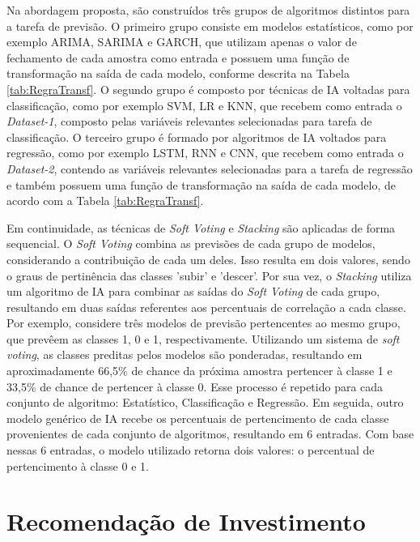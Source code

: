 Na abordagem proposta, são construídos três grupos de algoritmos distintos para a tarefa de previsão. O primeiro grupo consiste em modelos estatísticos, como por exemplo \ac{ARIMA}, \ac{SARIMA} e \ac{GARCH}, que utilizam apenas o valor de fechamento de cada amostra como entrada e possuem uma função de transformação na saída de cada modelo, conforme descrita na Tabela \ref{tab:RegraTransf}. O segundo grupo é composto por técnicas de \ac{IA} voltadas para classificação, como por exemplo \ac{SVM}, \ac{LR} e \ac{KNN}, que recebem como entrada o \textit{Dataset-1}, composto pelas variáveis relevantes selecionadas para tarefa de classificação. O terceiro grupo é formado por algoritmos de \ac{IA} voltados para regressão, como por exemplo \ac{LSTM}, \ac{RNN} e \ac{CNN}, que recebem como entrada o \textit{Dataset-2}, contendo as variáveis relevantes selecionadas para a tarefa de regressão e também possuem uma função de transformação na saída de cada modelo, de acordo com a Tabela \ref{tab:RegraTransf}. 

Em continuidade, as técnicas de \textit{Soft Voting} e \textit{Stacking} são aplicadas de forma sequencial. O \textit{Soft Voting} combina as previsões de cada grupo de modelos, considerando a contribuição de cada um deles. Isso resulta em dois valores, sendo o graus de pertinência das classes 'subir' e 'descer'. Por sua vez, o \textit{Stacking} utiliza um algoritmo de \ac{IA} para combinar as saídas do \textit{Soft Voting} de cada grupo, resultando em duas saídas referentes aos percentuais de correlação a cada classe. 
Por exemplo, considere três modelos de previsão pertencentes ao mesmo grupo, que prevêem as classes 1, 0 e 1, respectivamente. Utilizando um sistema de \textit{soft voting}, as classes preditas pelos modelos são ponderadas, resultando em aproximadamente 66,5\% de chance da próxima amostra pertencer à classe 1 e 33,5\% de chance de pertencer à classe 0. Esse processo é repetido para cada conjunto de algoritmo: Estatístico, Classificação e Regressão. Em seguida, outro modelo genérico de IA recebe os percentuais de pertencimento de cada classe provenientes de cada conjunto de algoritmos, resultando em 6 entradas. Com base nessas 6 entradas, o modelo utilizado retorna dois valores: o percentual de pertencimento à classe 0 e 1.

\section{Recomendação de Investimento}
\label{sec:estrategia}

